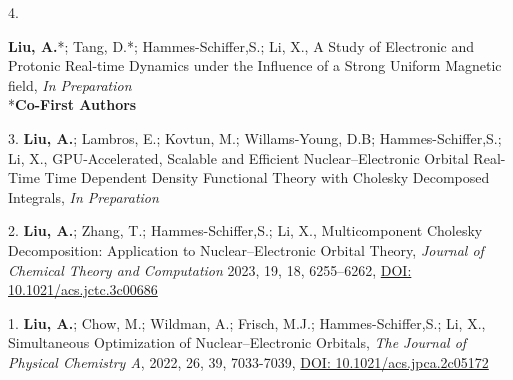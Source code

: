 


\begin{cvpublications}


\cvpublication
{4.}
{\parbox[t]{0.95\textwidth}{\strut \textbf{Liu, A.}*; Tang, D.*; Hammes-Schiffer,S.; Li, X., 
A Study of Electronic and Protonic Real-time Dynamics under the Influence of a Strong Uniform Magnetic field,
\textit{In Preparation}\\ 
\**\textbf{Co-First Authors}}}

\cvpublication
{3.} 
{\textbf{Liu, A.}; Lambros, E.; Kovtun, M.; Willams-Young, D.B; Hammes-Schiffer,S.; Li, X., 
GPU-Accelerated, Scalable and Efficient Nuclear–Electronic Orbital Real-Time Time Dependent Density Functional
Theory with Cholesky Decomposed Integrals, 
\textit{In Preparation}}


\cvpublication
{2.} 
{\textbf{Liu, A.}; Zhang, T.; Hammes-Schiffer,S.; Li, X., 
Multicomponent Cholesky Decomposition: Application to Nuclear–Electronic Orbital Theory, 
\textit{Journal of Chemical Theory and Computation} 2023, 19, 18, 6255–6262, 
\href{https://pubs.acs.org/doi/10.1021/acs.jctc.3c00686}{DOI: 10.1021/acs.jctc.3c00686}}


\cvpublication
{1.} 
{\textbf{Liu, A.}; Chow, M.; Wildman, A.; Frisch, M.J.; Hammes-Schiffer,S.; Li, X., 
Simultaneous Optimization of Nuclear–Electronic Orbitals,  
\textit{The Journal of Physical Chemistry A}, 2022, 26, 39, 7033-7039, 
\href{https://pubs.acs.org/doi/10.1021/acs.jpca.2c05172}{DOI: 10.1021/acs.jpca.2c05172}} 
 





\end{cvpublications}
\vspace{-1cm}

